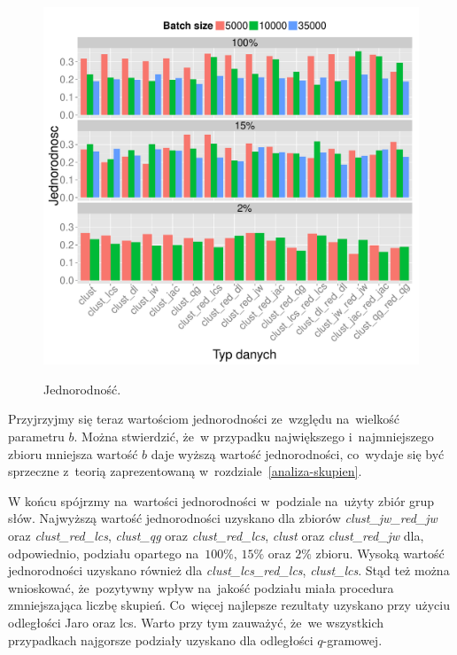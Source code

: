 \documentclass{praca1}
\begin{document}
\begin{figure}[!h]
  \centering
  \includegraphics[width=420pt]{plot10.pdf}\\
  \caption{Jednorodność.}\label{plot:005}
\end{figure}

Przyjrzyjmy się teraz wartościom jednorodności ze~względu na~wielkość parametru $b$. Można stwierdzić, że~w przypadku największego i~najmniejszego zbioru mniejsza wartość $b$ daje wyższą wartość jednorodności, co~wydaje się być sprzeczne z~teorią zaprezentowaną w~rozdziale~\ref{analiza-skupien}.

W końcu spójrzmy na~wartości jednorodności w~podziale na~użyty zbiór grup słów. Najwyższą wartość jednorodności uzyskano dla zbiorów \emph{clust\_jw\_red\_jw} oraz \emph{clust\_red\_lcs}, \emph{clust\_qg} oraz \emph{clust\_red\_lcs}, \emph{clust} oraz \emph{clust\_red\_jw} dla, odpowiednio, podziału opartego na~$100\%$, $15\%$ oraz $2\%$ zbioru. Wysoką wartość jednorodności uzyskano również dla \emph{clust\_lcs\_red\_lcs}, \emph{clust\_lcs}. Stąd też można wnioskować, że~pozytywny wpływ na~jakość podziału miała procedura zmniejszająca liczbę skupień. Co~więcej najlepsze rezultaty uzyskano przy użyciu odległości Jaro oraz lcs. Warto przy tym zauważyć, że~we wszystkich przypadkach najgorsze podziały uzyskano dla odległości $q$-gramowej.
\end{document}
